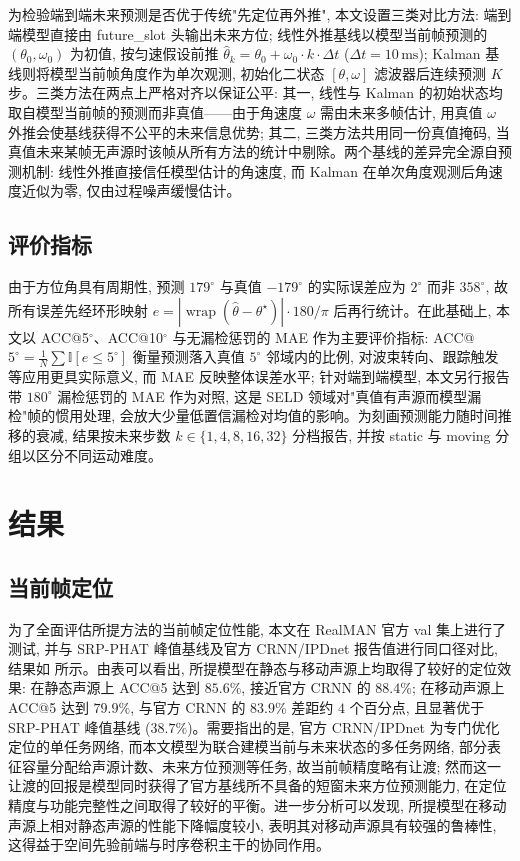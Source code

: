 \documentclass[lang=cn,a4paper,newtx]{elegantpaper}
\newcommand{\wrap}{\operatorname{wrap}}
\begin{document}
为检验端到端未来预测是否优于传统"先定位再外推", 本文设置三类对比方法: 端到端模型直接由 future\_slot 头输出未来方位; 线性外推基线以模型当前帧预测的 $(\theta_0,\omega_0)$ 为初值, 按匀速假设前推 $\hat{\theta}_k=\theta_0+\omega_0\cdot k\cdot\Delta t$ ($\Delta t{=}10\,\mathrm{ms}$); Kalman 基线则将模型当前帧角度作为单次观测, 初始化二状态 $[\theta,\omega]$ 滤波器后连续预测 $K$ 步。三类方法在两点上严格对齐以保证公平: 其一, 线性与 Kalman 的初始状态均取自模型当前帧的预测而非真值——由于角速度 $\omega$ 需由未来多帧估计, 用真值 $\omega$ 外推会使基线获得不公平的未来信息优势; 其二, 三类方法共用同一份真值掩码, 当真值未来某帧无声源时该帧从所有方法的统计中剔除。两个基线的差异完全源自预测机制: 线性外推直接信任模型估计的角速度, 而 Kalman 在单次角度观测后角速度近似为零, 仅由过程噪声缓慢估计。

\subsection{评价指标}

由于方位角具有周期性, 预测 $179^\circ$ 与真值 $-179^\circ$ 的实际误差应为 $2^\circ$ 而非 $358^\circ$, 故所有误差先经环形映射 $e=|\wrap(\hat{\theta}-\theta^\star)|\cdot 180/\pi$ 后再行统计。在此基础上, 本文以 ACC@5$^\circ$、ACC@10$^\circ$ 与无漏检惩罚的 MAE 作为主要评价指标: ACC@$5^\circ=\frac{1}{N}\sum\mathbb{I}[e\le 5^\circ]$ 衡量预测落入真值 $5^\circ$ 邻域内的比例, 对波束转向、跟踪触发等应用更具实际意义, 而 MAE 反映整体误差水平; 针对端到端模型, 本文另行报告带 $180^\circ$ 漏检惩罚的 MAE 作为对照, 这是 SELD 领域对"真值有声源而模型漏检"帧的惯用处理, 会放大少量低置信漏检对均值的影响。为刻画预测能力随时间推移的衰减, 结果按未来步数 $k\in\{1,4,8,16,32\}$ 分档报告, 并按 static 与 moving 分组以区分不同运动难度。

\section{结果}

\subsection{当前帧定位}

为了全面评估所提方法的当前帧定位性能, 本文在 RealMAN 官方 val 集上进行了测试, 并与 SRP-PHAT 峰值基线及官方 CRNN/IPDnet 报告值进行同口径对比, 结果如 所示。由表可以看出, 所提模型在静态与移动声源上均取得了较好的定位效果: 在静态声源上 ACC@5 达到 $85.6\%$, 接近官方 CRNN 的 $88.4\%$; 在移动声源上 ACC@5 达到 $79.9\%$, 与官方 CRNN 的 $83.9\%$ 差距约 $4$ 个百分点, 且显著优于 SRP-PHAT 峰值基线 ($38.7\%$)。需要指出的是, 官方 CRNN/IPDnet 为专门优化定位的单任务网络, 而本文模型为联合建模当前与未来状态的多任务网络, 部分表征容量分配给声源计数、未来方位预测等任务, 故当前帧精度略有让渡; 然而这一让渡的回报是模型同时获得了官方基线所不具备的短窗未来方位预测能力, 在定位精度与功能完整性之间取得了较好的平衡。进一步分析可以发现, 所提模型在移动声源上相对静态声源的性能下降幅度较小, 表明其对移动声源具有较强的鲁棒性, 这得益于空间先验前端与时序卷积主干的协同作用。
\end{document}
